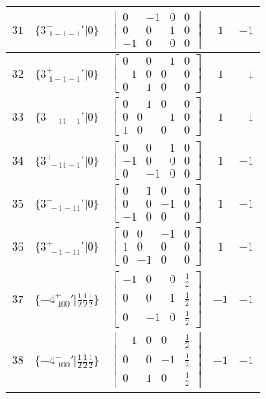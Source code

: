 \documentclass[fleqn,8pt]{jsarticle}
\begin{document}
\begin{longtable}{ccccc}
$ 31 $ & $ \{3^{-}_{\,\,1-1-1}{}'|0\} $ & $ \begin{bmatrix} 0 & -1 & 0 & 0 \\ 0 & 0 & 1 & 0 \\ -1 & 0 & 0 & 0 \end{bmatrix} $ & $ 1 $ & $ -1 $ \\ \hline
$ 32 $ & $ \{3^{+}_{\,\,1-1-1}{}'|0\} $ & $ \begin{bmatrix} 0 & 0 & -1 & 0 \\ -1 & 0 & 0 & 0 \\ 0 & 1 & 0 & 0 \end{bmatrix} $ & $ 1 $ & $ -1 $ \\ \hline
$ 33 $ & $ \{3^{-}_{\,\,-11-1}{}'|0\} $ & $ \begin{bmatrix} 0 & -1 & 0 & 0 \\ 0 & 0 & -1 & 0 \\ 1 & 0 & 0 & 0 \end{bmatrix} $ & $ 1 $ & $ -1 $ \\ \hline
$ 34 $ & $ \{3^{+}_{\,\,-11-1}{}'|0\} $ & $ \begin{bmatrix} 0 & 0 & 1 & 0 \\ -1 & 0 & 0 & 0 \\ 0 & -1 & 0 & 0 \end{bmatrix} $ & $ 1 $ & $ -1 $ \\ \hline
$ 35 $ & $ \{3^{-}_{\,\,-1-11}{}'|0\} $ & $ \begin{bmatrix} 0 & 1 & 0 & 0 \\ 0 & 0 & -1 & 0 \\ -1 & 0 & 0 & 0 \end{bmatrix} $ & $ 1 $ & $ -1 $ \\ \hline
$ 36 $ & $ \{3^{+}_{\,\,-1-11}{}'|0\} $ & $ \begin{bmatrix} 0 & 0 & -1 & 0 \\ 1 & 0 & 0 & 0 \\ 0 & -1 & 0 & 0 \end{bmatrix} $ & $ 1 $ & $ -1 $ \\ \hline
$ 37 $ & $ \{-4^{+}_{\,\,100}{}'|\frac{1}{2} \frac{1}{2} \frac{1}{2}\} $ & $ \begin{bmatrix} -1 & 0 & 0 & \frac{1}{2} \\ 0 & 0 & 1 & \frac{1}{2} \\ 0 & -1 & 0 & \frac{1}{2} \end{bmatrix} $ & $ -1 $ & $ -1 $ \\ \hline
$ 38 $ & $ \{-4^{-}_{\,\,100}{}'|\frac{1}{2} \frac{1}{2} \frac{1}{2}\} $ & $ \begin{bmatrix} -1 & 0 & 0 & \frac{1}{2} \\ 0 & 0 & -1 & \frac{1}{2} \\ 0 & 1 & 0 & \frac{1}{2} \end{bmatrix} $ & $ -1 $ & $ -1 $ \\ \hline

\end{longtable}
\end{document}
